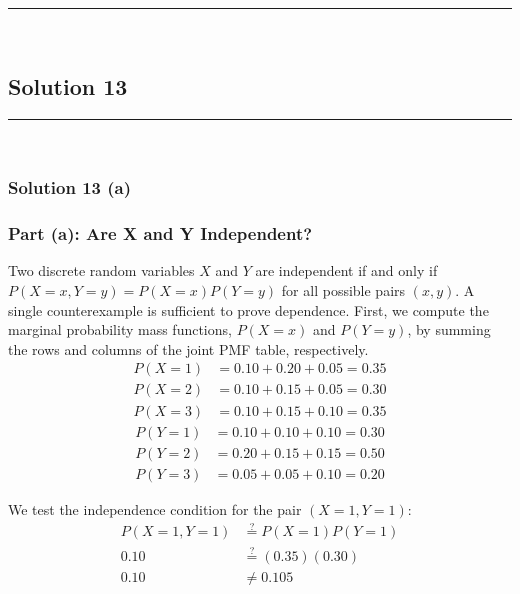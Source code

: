 \documentclass{article}
\begin{document}
\noindent\rule{\textwidth}{0.4pt}\\

\newpage

\subsection*{Solution 13}
\noindent\rule{\textwidth}{0.4pt}\\
\subsubsection*{Solution  13 (a)}

\subsubsection*{Part (a): Are X and Y Independent?}

\parbox{\textwidth}{
Two discrete random variables $X$ and $Y$ are independent if and only if $P(X=x, Y=y) = P(X=x)P(Y=y)$ for all possible pairs $(x, y)$. A single counterexample is sufficient to prove dependence. First, we compute the marginal probability mass functions, $P(X=x)$ and $P(Y=y)$, by summing the rows and columns of the joint PMF table, respectively.
\begin{align*}
    P(X=1) &= 0.10 + 0.20 + 0.05 = 0.35 \\
    P(X=2) &= 0.10 + 0.15 + 0.05 = 0.30 \\
    P(X=3) &= 0.10 + 0.15 + 0.10 = 0.35
\end{align*}
\begin{align*}
    P(Y=1) &= 0.10 + 0.10 + 0.10 = 0.30 \\
    P(Y=2) &= 0.20 + 0.15 + 0.15 = 0.50 \\
    P(Y=3) &= 0.05 + 0.05 + 0.10 = 0.20
\end{align*}
}
\vspace{1em}

We test the independence condition for the pair $(X=1, Y=1)$:
\begin{align*}
    P(X=1, Y=1) &\stackrel{?}{=} P(X=1)P(Y=1) \\
    0.10 &\stackrel{?}{=} (0.35)(0.30) \\
    0.10 &\neq 0.105
\end{align*}

\subsubsection*{}
\end{document}
